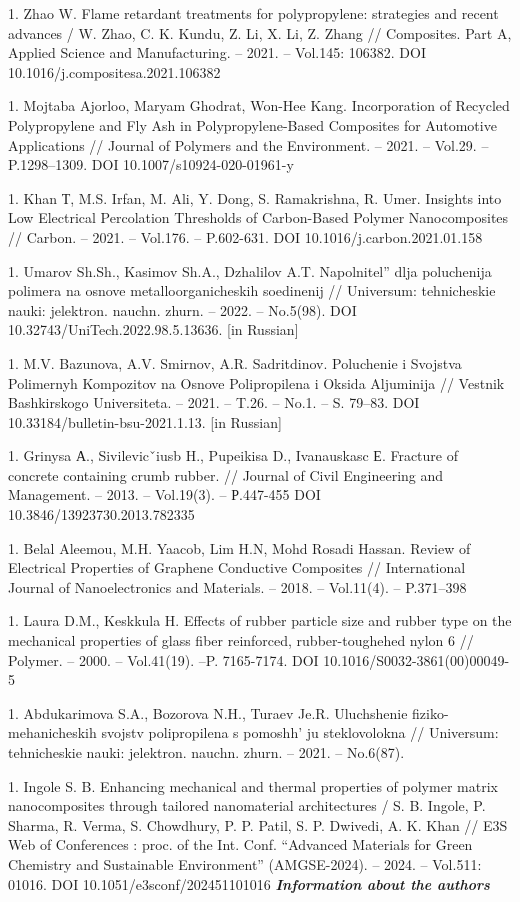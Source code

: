 1. Zhao W. Flame retardant treatments for polypropylene: strategies and
recent advances / W. Zhao, C. K. Kundu, Z. Li, X. Li, Z. Zhang //
Composites. Part A, Applied Science and Manufacturing. -- 2021. --
Vol.145: 106382. DOI 10.1016/j.compositesa.2021.106382

1. Mojtaba Ajorloo, Maryam Ghodrat, Won-Hee Kang. Incorporation of
Recycled Polypropylene and Fly Ash in Polypropylene-Based Composites
for Automotive Applications // Journal of Polymers and the
Environment. -- 2021. -- Vol.29. -- P.1298--1309. DOI
10.1007/s10924-020-01961-y

1. Khan Т, M.S. Irfan, M. Ali, Y. Dong, S. Ramakrishna, R. Umer. Insights
into Low Electrical Percolation Thresholds of Carbon-Based Polymer
Nanocomposites // Carbon. -- 2021. -- Vol.176. -- P.602-631. DOI
10.1016/j.carbon.2021.01.158

1. Umarov Sh.Sh., Kasimov Sh.A., Dzhalilov A.T.
Napolnitel''{} dlja poluchenija polimera
na osnove metalloorganicheskih soedinenij // Universum: tehnicheskie
nauki: jelektron. nauchn. zhurn. -- 2022. -- No.5(98). DOI
10.32743/UniTech.2022.98.5.13636. {[}in Russian{]}

1. M.V. Bazunova, A.V. Smirnov, A.R. Sadritdinov. Poluchenie i Svojstva
Polimernyh Kompozitov na Osnove Polipropilena i Oksida Aljuminija //
Vestnik Bashkirskogo Universiteta. -- 2021. -- T.26. -- No.1. -- S.
79--83. DOI 10.33184/bulletin-bsu-2021.1.13. {[}in Russian{]}

1. Grinysa А., Sivilevicˇiusb H., Pupeikisa D., Ivanauskasc Е. Fracture
of concrete containing crumb rubber. // Journal of Civil Engineering
and Management. -- 2013. -- Vol.19(3). -- Р.447-455 DOI
10.3846/13923730.2013.782335

1. Belal Aleemou, M.H. Yaacob, Lim H.N, Mohd Rosadi Hassan. Review of
Electrical Properties of Graphene Conductive Composites //
International Journal of Nanoelectronics and Materials. -- 2018. --
Vol.11(4). -- P.371--398

1. Laura D.M., Keskkula H. Effects of rubber particle size and rubber
type on the mechanical properties of glass fiber reinforced,
rubber-toughehed nylon 6 // Polymer. -- 2000. -- Vol.41(19). --P.
7165-7174. DOI 10.1016/S0032-3861(00)00049-5

1. Abdukarimova S.A., Bozorova N.H., Turaev Je.R. Uluchshenie
fiziko-mehanicheskih svojstv polipropilena s
pomoshh' ju steklovolokna // Universum: tehnicheskie
nauki: jelektron. nauchn. zhurn. -- 2021. -- No.6(87).

1. Ingole S. B. Enhancing mechanical and thermal properties of polymer
matrix nanocomposites through tailored nanomaterial architectures / S.
B. Ingole, P. Sharma, R. Verma, S. Chowdhury, P. P. Patil, S. P.
Dwivedi, A. K. Khan // E3S Web of Conferences : proc. of the Int.
Conf. ``Advanced Materials for Green Chemistry and Sustainable
Environment'' (AMGSE-2024). -- 2024. -- Vol.511: 01016. DOI
10.1051/e3sconf/202451101016
\emph{{\bfseries Information about the authors}}

